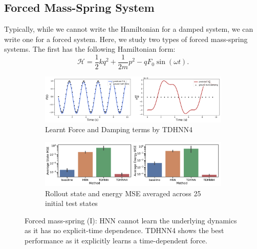 \documentclass{article}
\begin{document}
\subsection{Forced Mass-Spring System}

Typically, while we cannot write the Hamiltonian for a damped system, we can write one for a forced system. Here, we study two types of forced mass-spring systems. The first has the following Hamiltonian form:
\begin{equation}
\mathcal{H} = \frac{1}{2}kq^2 + \frac{1}{2m}p^2 - qF_0\sin(\omega t).
\end{equation}
\begin{figure}[h!]
\centering
\captionsetup{justification=centering}
	\begin{subfigure}[b]{0.48\textwidth}
		\centering
		\includegraphics[width=\textwidth]{figures/figures/forced_mass_spring/1/forced_mass_spring_dpdt_new_0.pdf}
		\caption{Learnt Force and Damping terms by TDHNN4}
	\end{subfigure}
	\begin{subfigure}[b]{0.48\textwidth}
	    \centering
		\includegraphics[width=\textwidth]{figures/figures/forced_mass_spring/1/forced_mass_spring_errors_0.pdf}
		\caption{Rollout state and energy MSE averaged across 25 initial test states}
	\end{subfigure}
\caption{Forced mass-spring (I): HNN cannot learn the underlying dynamics as it has no explicit-time dependence. TDHNN4 shows the best performance as it explicitly learns a time-dependent force.}
\label{fig.fmspring1}
\end{figure}
\end{document}
